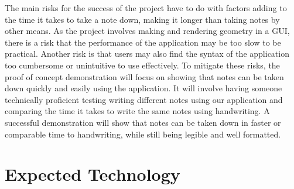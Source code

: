\documentclass{article}
\begin{document}

The main risks for the success of the project have to do with factors adding 
to the time it takes to take a note down, making it longer than
taking notes by other means. As the project involves making and rendering 
geometry in a GUI, there is a risk that the performance of the 
application may be too slow to be practical. Another risk is that users may 
also find the syntax of the application too cumbersome or 
unintuitive to use effectively. To mitigate these risks, the proof of concept 
demonstration will focus on showing that notes can be taken 
down quickly and easily using the application. It will involve having someone
 technically proficient testing writing different notes using our 
application and comparing the time it takes to write the same notes using 
handwriting. A successful demonstration will show that notes can be 
taken down in faster or comparable time to handwriting, while still being 
legible and well formatted.

\section{Expected Technology}



\end{document}
